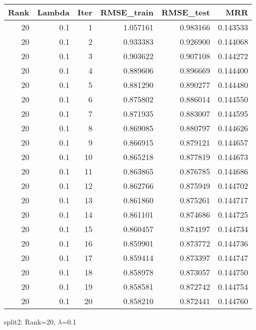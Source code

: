 \begin{tabular}{rrrrrr}
\toprule
 Rank &  Lambda &  Iter &  RMSE\_train &  RMSE\_test &       MRR \\
\midrule
   20 &     0.1 &     1 &    1.057161 &   0.983166 &  0.143533 \\
   20 &     0.1 &     2 &    0.933383 &   0.926900 &  0.144068 \\
   20 &     0.1 &     3 &    0.903622 &   0.907108 &  0.144272 \\
   20 &     0.1 &     4 &    0.889606 &   0.896669 &  0.144400 \\
   20 &     0.1 &     5 &    0.881290 &   0.890277 &  0.144480 \\
   20 &     0.1 &     6 &    0.875802 &   0.886014 &  0.144550 \\
   20 &     0.1 &     7 &    0.871935 &   0.883007 &  0.144595 \\
   20 &     0.1 &     8 &    0.869085 &   0.880797 &  0.144626 \\
   20 &     0.1 &     9 &    0.866915 &   0.879121 &  0.144657 \\
   20 &     0.1 &    10 &    0.865218 &   0.877819 &  0.144673 \\
   20 &     0.1 &    11 &    0.863865 &   0.876785 &  0.144686 \\
   20 &     0.1 &    12 &    0.862766 &   0.875949 &  0.144702 \\
   20 &     0.1 &    13 &    0.861860 &   0.875261 &  0.144717 \\
   20 &     0.1 &    14 &    0.861101 &   0.874686 &  0.144725 \\
   20 &     0.1 &    15 &    0.860457 &   0.874197 &  0.144734 \\
   20 &     0.1 &    16 &    0.859901 &   0.873772 &  0.144736 \\
   20 &     0.1 &    17 &    0.859414 &   0.873397 &  0.144747 \\
   20 &     0.1 &    18 &    0.858978 &   0.873057 &  0.144750 \\
   20 &     0.1 &    19 &    0.858581 &   0.872742 &  0.144754 \\
   20 &     0.1 &    20 &    0.858210 &   0.872441 &  0.144760 \\
\bottomrule
\end{tabular}

\caption{split2: Rank=20, $\lambda$=0.1}

